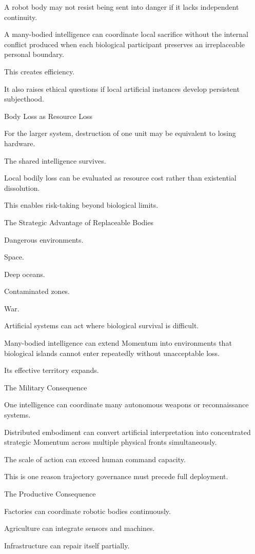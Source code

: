 A robot body may not resist being sent into danger if it lacks independent continuity.

A many-bodied intelligence can coordinate local sacrifice without the internal conflict produced when each biological participant preserves an irreplaceable personal boundary.

This creates efficiency.

It also raises ethical questions if local artificial instances develop persistent subjecthood.

Body Loss as Resource Loss

For the larger system, destruction of one unit may be equivalent to losing hardware.

The shared intelligence survives.

Local bodily loss can be evaluated as resource cost rather than existential dissolution.

This enables risk-taking beyond biological limits.

The Strategic Advantage of Replaceable Bodies

Dangerous environments.

Space.

Deep oceans.

Contaminated zones.

War.

Artificial systems can act where biological survival is difficult.

Many-bodied intelligence can extend Momentum into environments that biological islands cannot enter repeatedly without unacceptable loss.

Its effective territory expands.

The Military Consequence

One intelligence can coordinate many autonomous weapons or reconnaissance systems.

Distributed embodiment can convert artificial interpretation into concentrated strategic Momentum across multiple physical fronts simultaneously.

The scale of action can exceed human command capacity.

This is one reason trajectory governance must precede full deployment.

The Productive Consequence

Factories can coordinate robotic bodies continuously.

Agriculture can integrate sensors and machines.

Infrastructure can repair itself partially.

